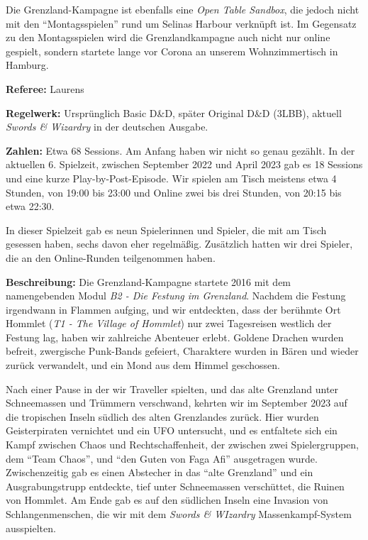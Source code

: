 \documentclass[11pt]{wbzine}
\begin{document}
\begin{multicols}{2}
Die Grenzland-Kampagne ist ebenfalls eine \textit{Open Table Sandbox},
die jedoch nicht mit den ``Montagsspielen'' rund um Selinas Harbour
verknüpft ist. Im Gegensatz zu den Montagsspielen wird die
Grenzlandkampagne auch nicht nur online gespielt, sondern startete
lange vor Corona an unserem Wohnzimmertisch in Hamburg.

\textbf{Referee:} Laurens

\textbf{Regelwerk:} Ursprünglich Basic D\&D, später Original D\&D
(3LBB),
aktuell \textit{Swords \& Wizardry} in der deutschen Ausgabe.

\textbf{Zahlen:} Etwa 68 Sessions. Am Anfang haben wir nicht so
genau gezählt. In der aktuellen 6. Spielzeit, zwischen September
2022 und April 2023 gab es 18 Sessions und eine kurze
Play-by-Post-Episode. Wir spielen am Tisch meistens etwa 4 Stunden,
von 19:00 bis 23:00 und Online zwei bis drei Stunden, von 20:15 bis
etwa 22:30. 

In dieser Spielzeit gab es neun Spielerinnen und Spieler, die mit am
Tisch gesessen haben, sechs davon eher regelmäßig. Zusätzlich
hatten wir drei Spieler, die an den Online-Runden teilgenommen
haben.

\textbf{Beschreibung:} Die Grenzland-Kampagne startete 2016 mit dem
namengebenden Modul \textit{B2 - Die Festung im Grenzland}. Nachdem
die Festung irgendwann in Flammen aufging, und wir entdeckten, dass
der berühmte Ort Hommlet (\textit{T1 - The Village of Hommlet}) nur
zwei Tagesreisen westlich der Festung lag, haben wir zahlreiche
Abenteuer erlebt. Goldene Drachen wurden befreit, zwergische
Punk-Bands gefeiert, Charaktere wurden in Bären und wieder zurück
verwandelt, und ein Mond aus dem Himmel geschossen.

Nach einer Pause in der wir Traveller spielten, und das alte
Grenzland unter Schneemassen und Trümmern verschwand, kehrten wir im
September 2023 auf die tropischen Inseln südlich des alten
Grenzlandes zurück. Hier wurden Geisterpiraten vernichtet und ein
UFO untersucht, und es entfaltete sich ein Kampf zwischen Chaos und
Rechtschaffenheit, der zwischen zwei Spielergruppen, dem ``Team
Chaos'', und ``den Guten von Faga Afi'' ausgetragen wurde.
Zwischenzeitig gab es einen Abstecher in das ``alte Grenzland'' und
ein Ausgrabungstrupp entdeckte, tief unter Schneemassen verschüttet,
die Ruinen von Hommlet. 
Am Ende gab es auf den südlichen Inseln
eine Invasion von Schlangenmenschen, die wir mit dem \textit{Swords
\& WIzardry} Massenkampf-System ausspielten.

\end{multicols}
\end{document}
